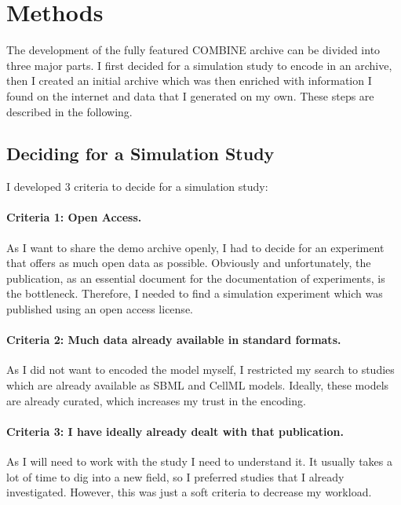 
\section{Methods}

The development of the fully featured COMBINE archive can be divided into three major parts.
I first decided for a simulation study to encode in an archive, then I created an initial archive which was then enriched with information I found on the internet and data that I generated on my own.
These steps are described in the following.

\subsection{Deciding for a Simulation Study}

I developed 3 criteria to decide for a simulation study:

\paragraph{Criteria 1: Open Access.}
As I want to share the demo archive openly, I had to decide for an experiment that offers as much open data as possible.
Obviously and unfortunately, the publication, as an essential document for the documentation of experiments, is the bottleneck.
Therefore, I needed to find a simulation experiment which was published using an open access license.

\paragraph{Criteria 2: Much data already available in standard formats.}
As I did not want to encoded the model myself, I restricted my search to studies which are already available as SBML and CellML models.
Ideally, these models are already curated, which increases my trust in the encoding.

\paragraph{Criteria 3: I have ideally already dealt with that publication.}
As I will need to work with the study I need to understand it.
It usually takes a lot of time to dig into a new field, so I preferred studies that I already investigated.
However, this was just a soft criteria to decrease my workload.


